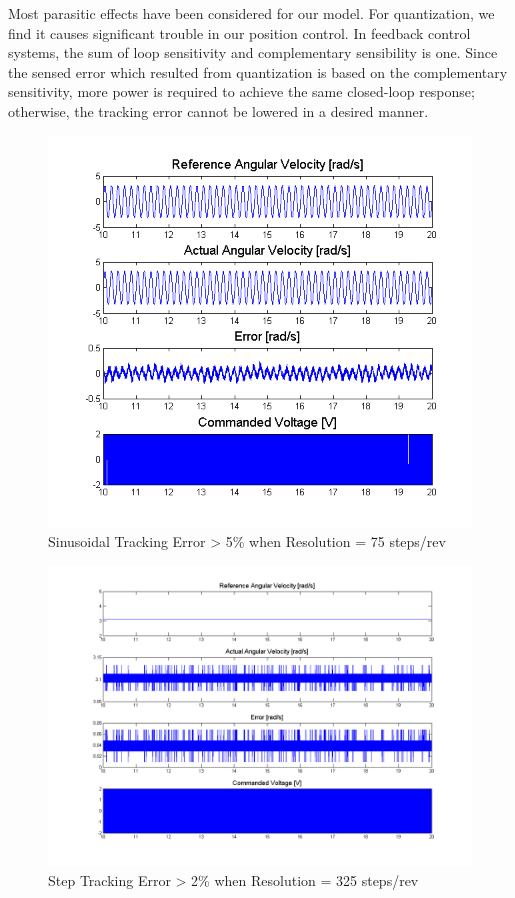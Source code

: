 \documentclass{article}
\theoremstyle{plain}
\theoremstyle{definition}
\theoremstyle{remark}
\begin{document}
Most parasitic effects have been considered for our model. For quantization, we find it causes significant trouble in our position control. In feedback control systems, the sum of loop sensitivity  and complementary sensibility is one. Since the sensed error which resulted from quantization is based on the complementary sensitivity, more power is required to achieve the same closed-loop response; otherwise, the tracking error cannot be lowered in a desired manner. 

\begin{figure}[htb]
\begin{center}
\includegraphics[width = 14cm]{q5c_sine_75.png}
\caption{Sinusoidal Tracking Error > 5\% when Resolution = 75 steps/rev}
\label{q5_c1}
\end{center}
\end{figure}

\begin{figure}[htb]
\begin{center}
\includegraphics[width = 14cm]{q5c_step_325.png}
\caption{Step Tracking Error > 2\% when Resolution = 325 steps/rev}
\label{q5_c2}
\end{center}
\end{figure}
\end{document}
